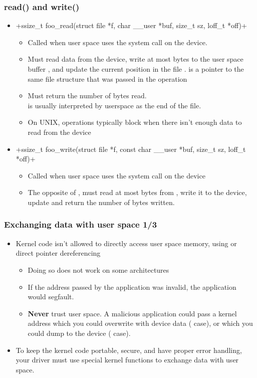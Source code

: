 \begin{frame}[fragile]
  \frametitle{read() and write()}
  \begin{itemize}
  \item {}+ssize_t foo_read(struct file *f, char __user *buf, size_t sz, loff_t *off)+
    \begin{itemize}
    \item Called when user space uses the  system call on
      the device.
    \item Must read data from the device, write at most 
      bytes to the user space buffer , and update the
      current position in the file .  is a pointer
      to the same file structure that was passed in the 
      operation
    \item Must return the number of bytes read.\\
	   is usually interpreted by userspace as the end of
          the file.
    \item On UNIX,  operations typically block when there
      isn't enough data to read from the device
    \end{itemize}
  \item {}+ssize_t foo_write(struct file *f, const char __user *buf, size_t sz, loff_t *off)+
    \begin{itemize}
    \item Called when user space uses the  system call
      on the device
    \item The opposite of , must read at most 
      bytes from , write it to the device, update 
      and return the number of bytes written.
    \end{itemize}
  \end{itemize}
\end{frame}

\begin{frame}
  \frametitle{Exchanging data with user space 1/3}
  \begin{itemize}
  \item Kernel code isn't allowed to directly access user space
    memory, using  or direct pointer dereferencing
    \begin{itemize}
    \item Doing so does not work on some architectures
    \item If the address passed by the application was invalid, the
      application would segfault.
    \item {\bf Never} trust user space. A malicious application could
      pass a kernel address which you could overwrite with device data
      ( case), or which you could dump to the device
      ( case).
    \end{itemize}
  \item To keep the kernel code portable, secure, and have proper
    error handling, your driver must use special kernel functions
    to exchange data with user space.
  \end{itemize}
\end{frame}

